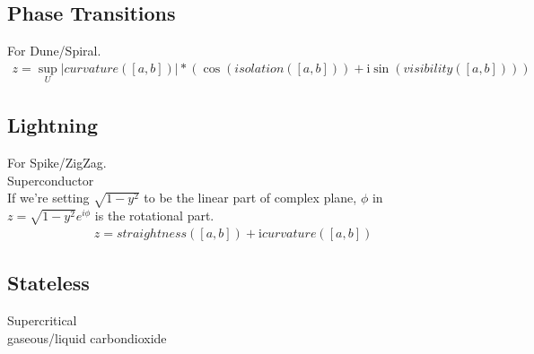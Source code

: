 \documentclass{report}
\begin{document}
\subsection{Phase Transitions}
For Dune/Spiral.
\begin{align}
z =  \sup_{U}\lvert curvature([a,b]) \rvert*(\cos{(isolation([a,b]))} +\mathrm{i} \sin{(visibility([a,b]))})
\end{align}

\subsection{Lightning}
For Spike/ZigZag.\\
Superconductor\\
If we're setting $\sqrt{1-y^2}$ to be the linear part of complex plane, $\phi$ in $z=\sqrt{1-y^2}e^{i\phi}$ is the rotational part.
\begin{align}
z =  straightness([a,b]) + \mathrm{i} curvature([a,b])
\end{align}

\subsection{Stateless}
Supercritical\\
gaseous/liquid carbondioxide

\printbibliography
\end{document}
